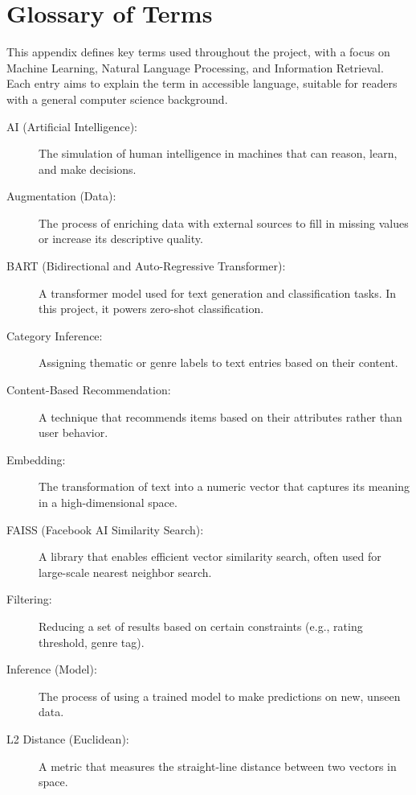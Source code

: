 \chapter{Glossary of Terms}
\label{appendix:glossary}

This appendix defines key terms used throughout the project, with a focus on Machine Learning, Natural Language Processing, and Information Retrieval. Each entry aims to explain the term in accessible language, suitable for readers with a general computer science background.

\begin{description}
    \item[AI (Artificial Intelligence):] The simulation of human intelligence in machines that can reason, learn, and make decisions.

    \item[Augmentation (Data):] The process of enriching data with external sources to fill in missing values or increase its descriptive quality.

    \item[BART (Bidirectional and Auto-Regressive Transformer):] A transformer model used for text generation and classification tasks. In this project, it powers zero-shot classification.

    \item[Category Inference:] Assigning thematic or genre labels to text entries based on their content.

    \item[Content-Based Recommendation:] A technique that recommends items based on their attributes rather than user behavior.

    \item[Embedding:] The transformation of text into a numeric vector that captures its meaning in a high-dimensional space.

    \item[FAISS (Facebook AI Similarity Search):] A library that enables efficient vector similarity search, often used for large-scale nearest neighbor search.

    \item[Filtering:] Reducing a set of results based on certain constraints (e.g., rating threshold, genre tag).

    \item[Inference (Model):] The process of using a trained model to make predictions on new, unseen data.

    \item[L2 Distance (Euclidean):] A metric that measures the straight-line distance between two vectors in space.


\end{description}

